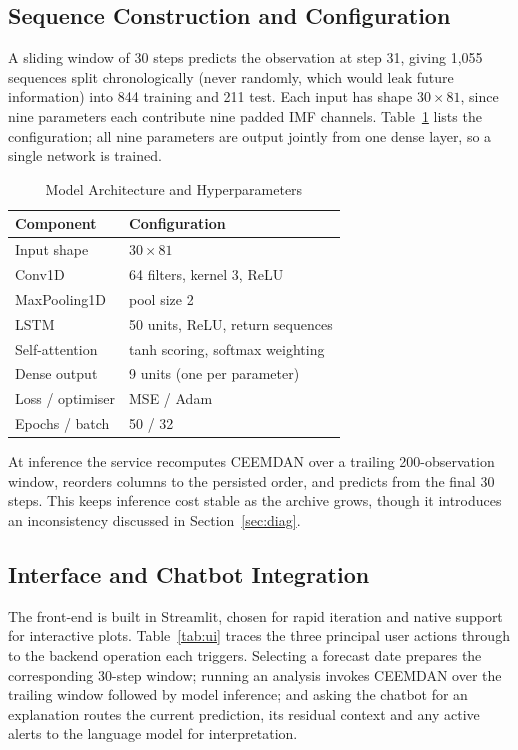 \documentclass[conference]{IEEEtran}
\begin{document}
\subsection{Sequence Construction and Configuration}

A sliding window of 30 steps predicts the observation at step 31, giving
1{,}055 sequences split chronologically (never randomly, which would leak
future information) into 844 training and 211 test. Each input has shape
$30 \times 81$, since nine parameters each contribute nine padded IMF channels.
Table~\ref{tab:arch} lists the configuration; all nine parameters are output
jointly from one dense layer, so a single network is trained.

\begin{table}[!t]
\caption{Model Architecture and Hyperparameters}
\label{tab:arch}
\centering
\small
\begin{tabular}{ll}
\toprule
\textbf{Component} & \textbf{Configuration} \\
\midrule
Input shape        & $30 \times 81$ \\
Conv1D             & 64 filters, kernel 3, ReLU \\
MaxPooling1D       & pool size 2 \\
LSTM               & 50 units, ReLU, return sequences \\
Self-attention     & tanh scoring, softmax weighting \\
Dense output       & 9 units (one per parameter) \\
Loss / optimiser   & MSE / Adam \\
Epochs / batch     & 50 / 32 \\
\bottomrule
\end{tabular}
\end{table}

At inference the service recomputes CEEMDAN over a trailing 200-observation
window, reorders columns to the persisted order, and predicts from the final 30
steps. This keeps inference cost stable as the archive grows, though it
introduces an inconsistency discussed in Section~\ref{sec:diag}.

\subsection{Interface and Chatbot Integration}

The front-end is built in Streamlit, chosen for rapid iteration and native
support for interactive plots. Table~\ref{tab:ui} traces the three principal
user actions through to the backend operation each triggers. Selecting a
forecast date prepares the corresponding 30-step window; running an analysis
invokes CEEMDAN over the trailing window followed by model inference; and
asking the chatbot for an explanation routes the current prediction, its
residual context and any active alerts to the language model for
interpretation.
\end{document}
